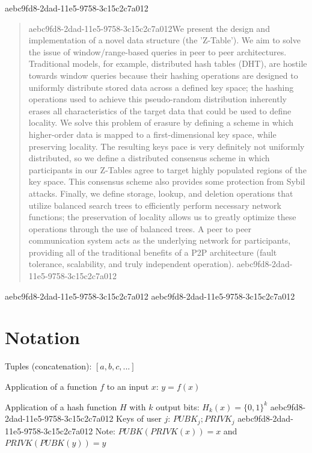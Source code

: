 \documentclass[12pt]{article}
\begin{document}
aebc9fd8-2dad-11e5-9758-3c15c2c7a012\maketitle

\begin{abstract}
aebc9fd8-2dad-11e5-9758-3c15c2c7a012We present the design and implementation of a novel data structure (the 'Z-Table'). We aim to solve the issue of window/range-based queries in peer to peer architectures. Traditional models, for example,  distributed hash tables (DHT), are hostile towards window queries because their hashing operations are designed to uniformly distribute stored data across a defined key space; the hashing operations used to achieve this pseudo-random distribution inherently erases all characteristics of the target data that could be used to define locality. We solve this problem of erasure by defining a scheme in which higher-order data is mapped to a first-dimensional key space, while preserving locality. The resulting keys pace is very definitely not uniformly distributed, so we define a distributed consensus scheme in which participants in our Z-Tables agree to target highly populated regions of the key space. This consensus scheme also provides some protection from Sybil attacks. Finally, we define storage, lookup, and deletion operations that utilize balanced search trees to efficiently perform necessary network functions; the preservation of locality allows us to greatly optimize these operations through the use of balanced trees. A peer to peer communication system acts as the underlying network for participants, providing all of the traditional benefits of a P2P architecture (fault tolerance, scalability, and truly independent operation).
aebc9fd8-2dad-11e5-9758-3c15c2c7a012\end{abstract}
aebc9fd8-2dad-11e5-9758-3c15c2c7a012
aebc9fd8-2dad-11e5-9758-3c15c2c7a012\section{Notation}

Tuples (concatenation): $[a,b,c,...]$

Application of a function $f$ to an input $x$: $y=f(x)$

Application of a hash function $H$ with $k$ output bits: $H_{k}(x) = \{0,1\}^k$
aebc9fd8-2dad-11e5-9758-3c15c2c7a012
Keys of user $j$: $ PUBK_j; PRIVK_j $
aebc9fd8-2dad-11e5-9758-3c15c2c7a012
Note: $PUBK(PRIVK(x)) = x$ and $PRIVK(PUBK(y)) = y$~
\end{document}
